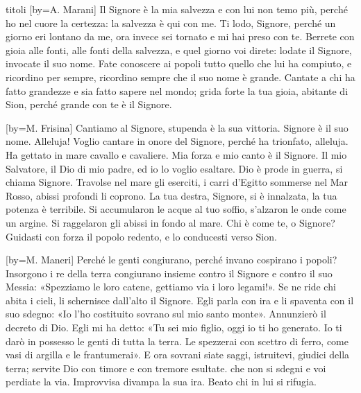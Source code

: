 \begin{songs}{titoli}
[by={A. Marani}]
\beginchorus
Il Signore è la mia salvezza
e con lui non temo più,
perché ho nel cuore la certezza:
la salvezza è qui con me.
\endchorus
\beginverse
Ti lodo, Signore, perché
un giorno eri lontano da me,
ora invece sei tornato
e mi hai preso con te.
\endverse
\beginverse
Berrete con gioia alle fonti,
alle fonti della salvezza,
e quel giorno voi direte:
lodate il Signore, invocate il suo nome.
\endverse
\beginverse
Fate conoscere ai popoli
tutto quello che lui ha compiuto,
e ricordino per sempre,
ricordino sempre che il suo nome è grande.
\endverse
\beginverse
Cantate a chi ha fatto grandezze
e sia fatto sapere nel mondo;
grida forte la tua gioia, abitante di Sion,
perché grande con te è il Signore.
\endverse
\endsong

[by={M. Frisina}]
\beginchorus
Cantiamo al Signore, stupenda è la sua vittoria.
Signore è il suo nome. Alleluja!
\endchorus
\beginverse
Voglio cantare in onore del Signore,
perché ha trionfato, alleluja.
Ha gettato in mare cavallo e cavaliere.
Mia forza e mio canto è il Signore.
Il mio Salvatore, il Dio di mio padre,
ed io lo voglio esaltare.
\endverse
\beginverse
Dio è prode in guerra, si chiama Signore.
Travolse nel mare gli eserciti,
i carri d'Egitto sommerse nel Mar Rosso,
abissi profondi li coprono.
La tua destra, Signore, si è innalzata,
la tua potenza è terribile.
\endverse
\beginverse
Si accumularon le acque al tuo soffio,
s'alzaron le onde come un argine.
Si raggelaron gli abissi in fondo al mare.
Chi è come te, o Signore?
Guidasti con forza il popolo redento,
e lo conducesti verso Sion.
\endverse
\endsong

[by={M. Maneri}]
\beginverse
Perché le genti congiurano,
perché invano cospirano i popoli?
Insorgono i re della terra
congiurano insieme contro il Signore e contro il suo Messia:
«Spezziamo le loro catene,
gettiamo via i loro legami!».
Se ne ride chi abita i cieli,
li schernisce dall'alto il Signore.
Egli parla con ira
e li spaventa con il suo sdegno:
«Io l'ho costituito sovrano sul mio santo monte».
Annunzierò il decreto di Dio. Egli mi ha detto:
«Tu sei mio figlio, oggi io ti ho generato.
Io ti darò in possesso le genti di tutta la terra.
Le spezzerai con scettro di ferro,
come vasi di argilla e le frantumerai».
E ora sovrani siate saggi, istruitevi, giudici della terra;
servite Dio con timore e con tremore esultate.
che non si sdegni e voi perdiate la via.
Improvvisa divampa la sua ira.
Beato chi in lui si rifugia.
\endverse
\endsong


\end{songs}
